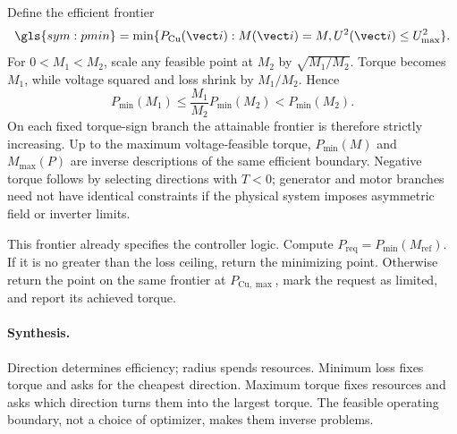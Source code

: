 Define the efficient frontier
\begin{equation}
 \gls{sym:pmin}=\min\{P_{\mathrm{Cu}}(\vect i):M(\vect i)=M,
 U^2(\vect i)\leq U_{\max}^2\}.
 \label{eq:pmin-frontier}
\end{equation}
For \(0<M_1<M_2\), scale any feasible point at \(M_2\) by
\(\sqrt{M_1/M_2}\). Torque becomes \(M_1\), while voltage squared and loss
shrink by \(M_1/M_2\). Hence
\begin{equation}
 P_{\min}(M_1)\leq\frac{M_1}{M_2}P_{\min}(M_2)<P_{\min}(M_2).
 \label{eq:frontier-monotone}
\end{equation}
On each fixed torque-sign branch the attainable frontier is therefore strictly
increasing. Up to the maximum voltage-feasible torque,
\(P_{\min}(M)\) and \(M_{\max}(P)\) are inverse descriptions of the same
efficient boundary. Negative torque follows by selecting directions with
\(T<0\); generator and motor branches need not have identical constraints if
the physical system imposes asymmetric field or inverter limits.



This frontier already specifies the controller logic. Compute
\(P_{\mathrm{req}}=P_{\min}(M_{\mathrm{ref}})\). If it is no greater than the
loss ceiling, return the minimizing point. Otherwise return the point on the
same frontier at \(P_{\mathrm{Cu},\max}\), mark the request as limited, and
report its achieved torque.

\paragraph{Synthesis.}
Direction determines efficiency; radius spends resources. Minimum loss fixes
torque and asks for the cheapest direction. Maximum torque fixes resources and
asks which direction turns them into the largest torque. The feasible
operating boundary, not a choice of optimizer, makes them inverse problems.
